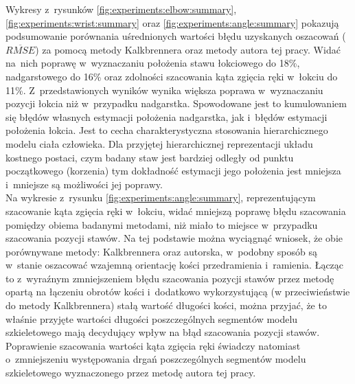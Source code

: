 Wykresy z~rysunków \ref{fig:experiments:elbow:summary}, \ref{fig:experiments:wrist:summary} oraz \ref{fig:experiments:angle:summary} pokazują podsumowanie porównania uśrednionych wartości błędu uzyskanych oszacowań ($\overline{RMSE}$) za pomocą metody Kalkbrennera oraz metody autora tej pracy.
Widać na~nich poprawę w~wyznaczaniu położenia stawu łokciowego do 18\%, nadgarstowego do 16\% oraz zdolności szacowania kąta zgięcia ręki w~łokciu do 11\%. Z~przedstawionych wyników wynika większa poprawa w~wyznaczaniu pozycji łokcia niż w~przypadku nadgarstka. Spowodowane jest to kumulowaniem się błędów własnych estymacji położenia nadgarstka, jak i~błędów estymacji położenia łokcia. Jest to cecha charakterystyczna stosowania hierarchicznego modelu ciała człowieka. Dla przyjętej hierarchicznej reprezentacji układu kostnego postaci, czym badany staw jest bardziej odległy od punktu początkowego (korzenia) tym dokładność estymacji jego położenia jest mniejsza i~mniejsze są możliwości jej poprawy.\\

Na wykresie z~rysunku \ref{fig:experiments:angle:summary}, reprezentującym szacowanie kąta zgięcia ręki w~łokciu, widać mniejszą poprawę błędu szacowania pomiędzy obiema badanymi metodami, niż miało to miejsce w~przypadku szacowania pozycji stawów. Na tej podstawie można wyciągnąć wniosek, że obie porównywane metody: Kalkbrennera oraz autorska, w~podobny sposób są w~stanie oszacować wzajemną orientację kości przedramienia i~ramienia. Łącząc to z~wyraźnym zmniejszeniem błędu szacowania pozycji stawów przez metodę opartą na łączeniu obrotów kości i~dodatkowo wykorzystującą (w przeciwieństwie do metody Kalkbrennera) stałą wartość długości kości, można przyjać, że to właśnie przyjęte wartości długości poszczególnych segmentów modelu szkieletowego mają decydujący wpływ na błąd szacowania pozycji stawów. Poprawienie szacowania wartości kąta zgięcia ręki świadczy natomiast o~zmniejszeniu występowania drgań poszczególnych segmentów modelu szkieletowego wyznaczonego przez metodę autora tej pracy.

